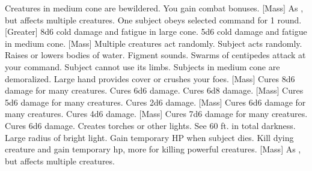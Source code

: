     {Creatures in medium cone are bewildered.}
    {You gain combat bonuses.}
[Mass]
    {As , but affects multiple creatures.}
    {One subject obeys selected command for 1 round.}
[Greater]
    {8d6 cold damage and fatigue in large cone.}
    {5d6 cold damage and fatigue in medium cone.}
[Mass]
    {Multiple creatures act randomly.}
    {Subject acts randomly.}
    {Raises or lowers bodies of water.}
    {Figment sounds.}
    {Swarms of centipedes attack at your command.}
    {Subject cannot use its limbs.}
    {Subjects in medium cone are demoralized.}
    {Large hand provides cover or crushes your foes.}
[Mass]
    {Cures 8d6 damage for many creatures.}
    {Cures 6d6 damage.}
    {Cures 6d8 damage.}
[Mass]
    {Cures 5d6 damage for many creatures.}
    {Cures 2d6 damage.}
[Mass]
    {Cures 6d6 damage for many creatures.}
    {Cures 4d6 damage.}
[Mass]
    {Cures 7d6 damage for many creatures.}
    {Cures 6d6 damage.}
    {Creates torches or other lights.}
    {See 60 ft. in total darkness.}
    {Large radius of bright light.}
    {Gain temporary HP when subject dies.}
    {Kill dying creature and gain temporary hp, more for killing powerful creatures.}
[Mass]
    {As , but affects multiple creatures.}

